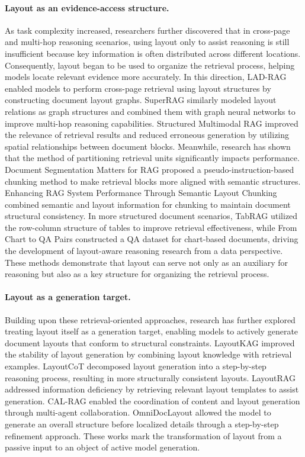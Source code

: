 \paragraph{Layout as an evidence-access structure.}
As task complexity increased, researchers further discovered that in cross-page and multi-hop reasoning scenarios, using layout only to assist reasoning is still insufficient because key information is often distributed across different locations. Consequently, layout began to be used to organize the retrieval process, helping models locate relevant evidence more accurately. In this direction, LAD-RAG \cite{ladrag2025} enabled models to perform cross-page retrieval using layout structures by constructing document layout graphs. SuperRAG \cite{superrag2025} similarly modeled layout relations as graph structures and combined them with graph neural networks to improve multi-hop reasoning capabilities. Structured Multimodal RAG \cite{structuredmmrag2025} improved the relevance of retrieval results and reduced erroneous generation by utilizing spatial relationships between document blocks. Meanwhile, research has shown that the method of partitioning retrieval units significantly impacts performance. Document Segmentation Matters for RAG \cite{docseg2025} proposed a pseudo-instruction-based chunking method to make retrieval blocks more aligned with semantic structures. Enhancing RAG System Performance Through Semantic Layout Chunking \cite{semanticlayoutchunking2025} combined semantic and layout information for chunking to maintain document structural consistency. In more structured document scenarios, TabRAG \cite{tabrag2025} utilized the row-column structure of tables to improve retrieval effectiveness, while From Chart to QA Pairs \cite{chart2qapairs2025} constructed a QA dataset for chart-based documents, driving the development of layout-aware reasoning research from a data perspective. These methods demonstrate that layout can serve not only as an auxiliary for reasoning but also as a key structure for organizing the retrieval process.

\paragraph{Layout as a generation target.}
Building upon these retrieval-oriented approaches, research has further explored treating layout itself as a generation target, enabling models to actively generate document layouts that conform to structural constraints. LayoutKAG \cite{layoutkag2024} improved the stability of layout generation by combining layout knowledge with retrieval examples. LayoutCoT \cite{shi2025layoutcot} decomposed layout generation into a step-by-step reasoning process, resulting in more structurally consistent layouts. LayoutRAG \cite{layoutrag2025} addressed information deficiency by retrieving relevant layout templates to assist generation. CAL-RAG \cite{calrag2025} enabled the coordination of content and layout generation through multi-agent collaboration. OmniDocLayout \cite{omnidoclayout2025} allowed the model to generate an overall structure before localized details through a step-by-step refinement approach. These works mark the transformation of layout from a passive input to an object of active model generation.

